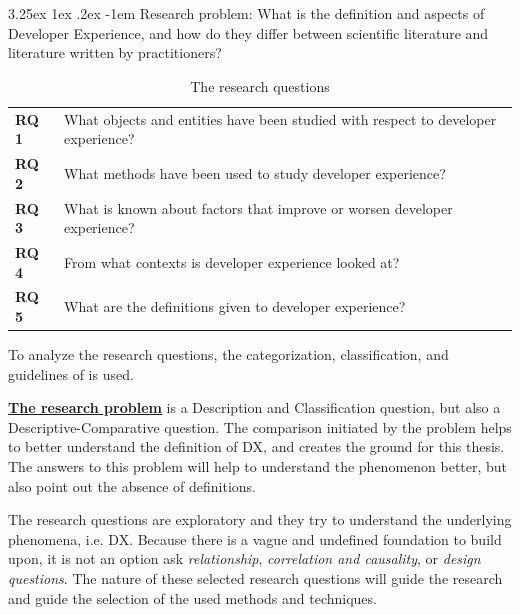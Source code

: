 \documentclass[english, 12pt, a4paper, sci, utf8, a-1b, online]{aaltothesis}
\makeatletter
\renewcommand\paragraph{\@startsection{paragraph}{5}{\z@}%
  {3.25ex \@plus1ex \@minus.2ex}%
  {-1em}%
  {\normalfont\normalsize\bfseries}}
\makeatother
\begin{document}
\newcommand{\researchproblem}{What is the definition and aspects of Developer Experience, and how do they differ between scientific literature and literature written by practitioners?}

\paragraph{Research problem:} \researchproblem \label{research-problem}

\newcommand{\rqone}{What objects and entities have been studied with respect to developer experience?}
\newcommand{\rqtwo}{What methods have been used to study developer experience?}
\newcommand{\rqthree}{What is known about factors that improve or worsen developer experience?}
\newcommand{\rqfour}{From what contexts is developer experience looked at?}
\newcommand{\rqfive}{What are the definitions given to developer experience?}

\begin{table}[ht]
  \begin{center}
    \begin{tabularx}{\textwidth}{l X}
      \textbf{RQ 1} & \rqone   \label{RQ1} \\
      \textbf{RQ 2} & \rqtwo   \label{RQ2} \\
      \textbf{RQ 3} & \rqthree \label{RQ3} \\
      \textbf{RQ 4} & \rqfour  \label{RQ4} \\
      \textbf{RQ 5} & \rqfive  \label{RQ5}
    \end{tabularx}
  \end{center}
  \caption{The research questions \label{researchquestions}}
\end{table}

To analyze the research questions, the categorization, classification, and guidelines of \textcite{easterbrook2008selecting} is used.

\textbf{\hyperref[research-problem]{The research problem}} is a Description and Classification question, but also a Descriptive-Comparative question. The comparison initiated by the problem helps to better understand the definition of DX, and creates the ground for this thesis. The answers to this problem will help to understand the phenomenon better, but also point out the absence of definitions.

The research questions are exploratory and they try to understand the underlying phenomena, i.e. DX. Because there is a vague and undefined foundation to build upon, it is not an option ask \textit{relationship}, \textit{correlation and causality}, or \textit{design questions}. The nature of these selected research questions will guide the research and guide the selection of the used methods and techniques.
\end{document}
